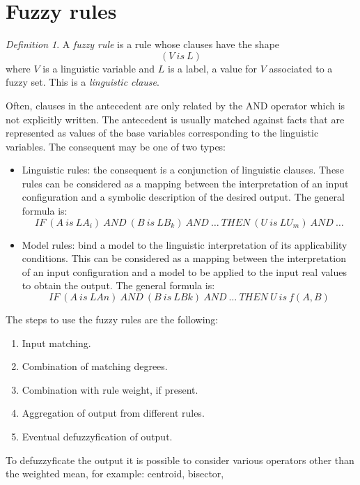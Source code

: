 \documentclass[12pt, a4paper]{report}
\theoremstyle{remark}
\newtheorem*{remark}{Definition}
\begin{document}
    \section{Fuzzy rules}
    \begin{remark}
        A \emph{fuzzy rule} is a rule whose clauses have the shape
        \[(V \: is \: L)\]
        where $V$ is a linguistic variable and $L$ is a label, a value for $V$ associated to a fuzzy set. This is a \emph{linguistic clause}.
    \end{remark}
    Often, clauses in the antecedent are only related by the AND operator which is not explicitly written. 
    The antecedent is usually matched against facts that are represented as values of the base variables corresponding to the linguistic variables.
    The consequent may be one of two types:
    \begin{itemize}
        \item Linguistic rules: the consequent is a conjunction of linguistic clauses. These rules can be considered as a mapping between
            the interpretation of an input configuration and a symbolic description of the desired output. The general formula is:
            \[IF \: (A \: is \: LA_i) \: AND \: (B \: is \: LB_k) \: AND \: \dots \: THEN \: (U \: is \: LU_m) \: AND \: \dots\]
        \item Model rules: bind a model to the linguistic interpretation of its applicability conditions. This can be considered as a mapping 
            between the interpretation of an input configuration and a model to be applied to the input real values to obtain the output. 
            The general formula is:
            \[IF \: (A \: is \: LAn) \: AND \: (B \: is \: LBk) \: AND \: \dots \: THEN \: U \: is \: f(A,B)\]
    \end{itemize}
    The steps to use the fuzzy rules are the following: 
    \begin{enumerate}
        \item Input matching.
        \item Combination of matching degrees.
        \item Combination with rule weight, if present.
        \item Aggregation of output from different rules. 
        \item Eventual defuzzyfication of output.
    \end{enumerate}
    To defuzzyficate the output it is possible to consider various operators other than the weighted mean, for example: centroid, bisector,
\end{document}
